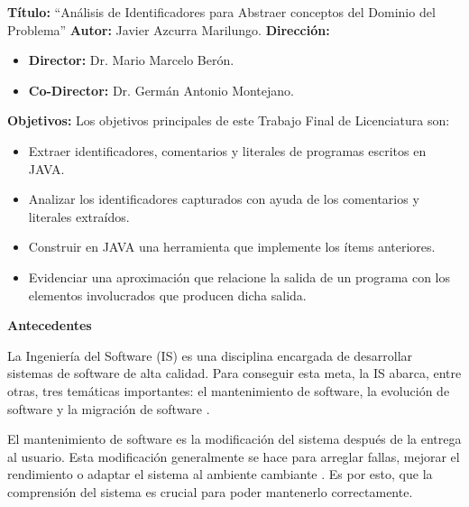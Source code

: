 \documentclass[a4paper,12pt]{article}
\begin{document}
{\Large \textbf{Título:}} “Análisis de Identificadores para Abstraer conceptos del Dominio del \mbox{Problema”}
\vskip0.5cm
{\Large \textbf{Autor:}} Javier Azcurra Marilungo.
\vskip0.5cm
{\Large \textbf{Dirección:}}
\begin{itemize}
\itemsep0em%
\item \textbf{Director:} Dr. Mario Marcelo Berón.

\item \textbf{Co-Director:} Dr. Germán Antonio Montejano.
\end{itemize}

{\Large \textbf{Objetivos:}} Los objetivos principales de este Trabajo Final de Licenciatura son:

\begin{itemize}
\itemsep0em%

\item Extraer identificadores, comentarios y literales de programas escritos en JAVA.

\item Analizar los identificadores capturados con ayuda de los comentarios y literales extraídos.

\item Construir en JAVA una herramienta que implemente los ítems anteriores.

\item Evidenciar una aproximación que relacione la salida de un programa con los elementos involucrados que producen dicha salida.

\end{itemize}
{\Large \textbf{Antecedentes}}
\vskip0.5cm

\hspace{0.5cm} La Ingeniería del Software (IS) es una disciplina encargada de desarrollar sistemas de software de alta calidad. Para conseguir esta meta, la IS abarca, entre otras, tres temáticas importantes: el mantenimiento de software, la evolución de software y la migración de software \cite{RSPMGH02}.

\hspace{0.5cm} El mantenimiento de software \cite{PFT02} es la modificación del sistema después de la entrega al usuario. Esta modificación generalmente se hace para arreglar fallas, mejorar el rendimiento o adaptar el sistema al ambiente cambiante \cite{STD610}. Es por esto, que la comprensión del sistema es crucial para poder mantenerlo correctamente.
\end{document}
